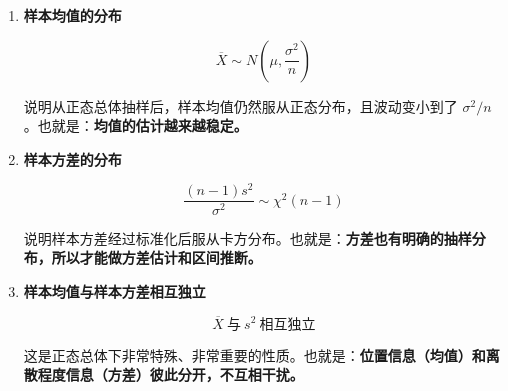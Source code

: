 \begin{enumerate}
    \item \textbf{样本均值的分布}
    
    \[
    \overline{X}\sim N\left(\mu,\frac{\sigma^2}{n}\right)
    \]
    
    说明从正态总体抽样后，样本均值仍然服从正态分布，且波动变小到了 $\sigma^2/n$。也就是：\textbf{均值的估计越来越稳定。}
    
    \item \textbf{样本方差的分布}
    
    \[
    \frac{(n-1)s^2}{\sigma^2}\sim \chi^2(n-1)
    \]
    
    说明样本方差经过标准化后服从卡方分布。也就是：\textbf{方差也有明确的抽样分布，所以才能做方差估计和区间推断。}
    
    \item \textbf{样本均值与样本方差相互独立}
    
    \[
    \overline{X}\ \text{与}\ s^2\ \text{相互独立}
    \]
    
    这是正态总体下非常特殊、非常重要的性质。也就是：\textbf{位置信息（均值）和离散程度信息（方差）彼此分开，不互相干扰。}
\end{enumerate}